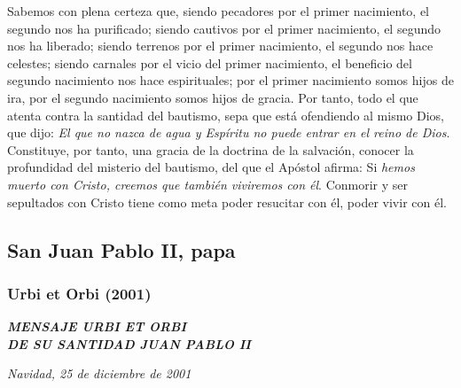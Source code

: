 Sabemos con plena certeza que, siendo pecadores por el primer nacimiento, el segundo nos ha purificado; siendo cautivos por el primer nacimiento, el segundo nos ha liberado; siendo terrenos por el primer nacimiento, el segundo nos hace celestes; siendo carnales por el vicio del primer nacimiento, el beneficio del segundo nacimiento nos hace espirituales; por el primer nacimiento somos hijos de ira, por el segundo nacimiento somos hijos de gracia. Por tanto, todo el que atenta contra la santidad del bautismo, sepa que está ofendiendo al mismo Dios, que dijo: \emph{El que no nazca de agua y Espíritu no puede entrar en el reino de Dios}. Constituye, por tanto, una gracia de la doctrina de la salvación, conocer la profundidad del misterio del bautismo, del que el Apóstol afirma: Si \emph{hemos muerto con Cristo, creemos que también viviremos con él}. Conmorir y ser sepultados con Cristo tiene como meta poder resucitar con él, poder vivir con él.


\subsection{San Juan Pablo II, papa}

\subsubsection{Urbi et Orbi (2001)} \textbf{\emph{MENSAJE URBI ET ORBI\\ DE SU SANTIDAD JUAN PABLO II}}

\emph{Navidad, 25 de diciembre de 2001}



